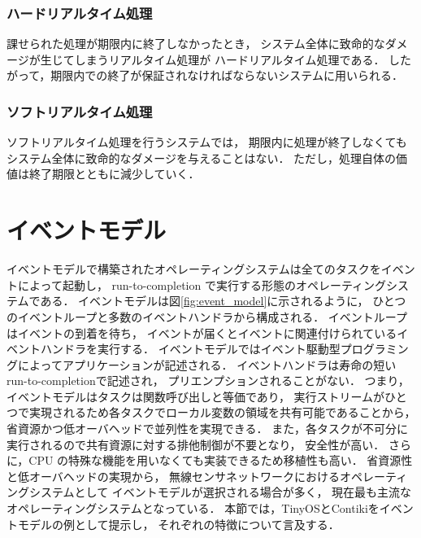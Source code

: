 \subsubsection{ハードリアルタイム処理}

\vspace{0.5em}課せられた処理が期限内に終了しなかったとき，
システム全体に致命的なダメージが生じてしまうリアルタイム処理が
ハードリアルタイム処理である．
したがって，期限内での終了が保証されなければならないシステムに用いられる．

\subsubsection{ソフトリアルタイム処理}

\vspace{0.5em}ソフトリアルタイム処理を行うシステムでは，
期限内に処理が終了しなくてもシステム全体に致命的なダメージを与えることはない．
ただし，処理自体の価値は終了期限とともに減少していく．






\section{イベントモデル}\label{sec:event_model}
イベントモデルで構築されたオペレーティングシステムは全てのタスクをイベントによって起動し，
run-to-completion で実行する形態のオペレーティングシステムである．
イベントモデルは図\ref{fig:event_model}に示されるように，
ひとつのイベントループと多数のイベントハンドラから構成される．
イベントループはイベントの到着を待ち，
イベントが届くとイベントに関連付けられているイベントハンドラを実行する．
イベントモデルではイベント駆動型プログラミングによってアプリケーションが記述される．
イベントハンドラは寿命の短いrun-to-completionで記述され，
プリエンプションされることがない．
つまり，イベントモデルはタスクは関数呼び出しと等価であり，
実行ストリームがひとつで実現されるため各タスクでローカル変数の領域を共有可能であることから，
省資源かつ低オーバヘッドで並列性を実現できる．
また，各タスクが不可分に実行されるので共有資源に対する排他制御が不要となり，
安全性が高い．
さらに，CPU の特殊な機能を用いなくても実装できるため移植性も高い．
省資源性と低オーバヘッドの実現から，
無線センサネットワークにおけるオペレーティングシステムとして
イベントモデルが選択される場合が多く，
現在最も主流なオペレーティングシステムとなっている．
本節では，TinyOSとContikiをイベントモデルの例として提示し，
それぞれの特徴について言及する．

